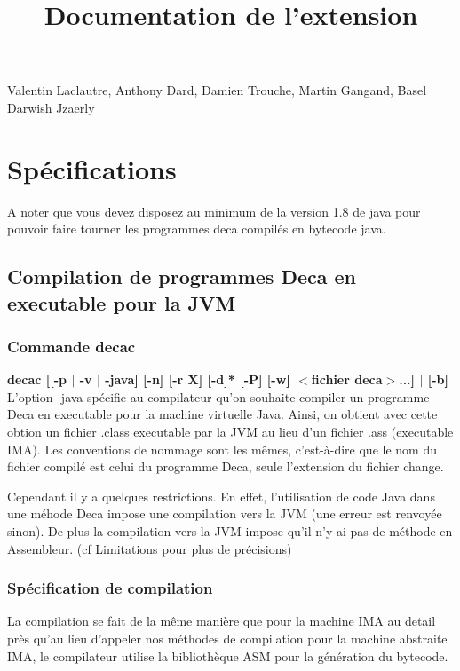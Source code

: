 \documentclass[12pt, a4paper, one side]{article}
\title{Documentation de l'extension}
\author{}
\date{}
\begin{document}
    \maketitle

    \begin{center}
        Valentin Laclautre, Anthony Dard, Damien Trouche, Martin Gangand, Basel Darwish Jzaerly
    \end{center}

    \tableofcontents

    \newpage

    \section{Spécifications}

    A noter que vous devez disposez au minimum de la version 1.8 de java pour
    pouvoir faire tourner les programmes deca compilés en bytecode java.

    \subsection{Compilation de programmes Deca en executable pour la JVM}
    \subsubsection{Commande decac}
    \textbf{decac [[-p $\mid$ -v $\mid$ -java] [-n] [-r X] [-d]* [-P] [-w] $<$fichier deca$>$...] $\mid$ [-b]}
    \\

    L'option -java spécifie au compilateur qu'on souhaite compiler un programme Deca en executable pour la machine virtuelle Java.
    Ainsi, on obtient avec cette obtion un fichier .class executable par la JVM au lieu d'un fichier .ass (executable IMA). Les conventions de nommage sont les mêmes, c'est-à-dire que le nom du fichier compilé est celui du programme Deca, seule l'extension du fichier change.

    Cependant il y a quelques restrictions. En effet, l'utilisation de code Java dans une méhode Deca impose une compilation vers la JVM (une erreur est renvoyée sinon). De plus la compilation vers la JVM impose qu'il n'y ai pas de méthode en Assembleur. (cf Limitations pour plus de précisions)

    \subsubsection{Spécification de compilation}
    La compilation se fait de la même manière que pour la machine IMA au detail près qu'au lieu d'appeler nos méthodes de compilation pour la machine abstraite IMA, le compilateur utilise la bibliothèque ASM\cite{ASM} pour la génération du bytecode.
\end{document}
